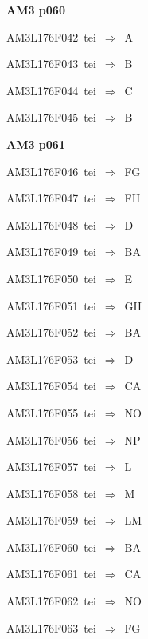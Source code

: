 \par\vfill\eject
{\bf\hfill AM3 p060\hfill\hbox{}}\par\bigskip
{\sixrm AM3L176F042\ {\sixit tei}\ }$\Rightarrow$\ A\par\smallskip
{\sixrm AM3L176F043\ {\sixit tei}\ }$\Rightarrow$\ B\par\smallskip
{\sixrm AM3L176F044\ {\sixit tei}\ }$\Rightarrow$\ C\par\smallskip
{\sixrm AM3L176F045\ {\sixit tei}\ }$\Rightarrow$\ B\par\smallskip

\par\vfill\eject
{\bf\hfill AM3 p061\hfill\hbox{}}\par\bigskip
{\sixrm AM3L176F046\ {\sixit tei}\ }$\Rightarrow$\ FG\par\smallskip
{\sixrm AM3L176F047\ {\sixit tei}\ }$\Rightarrow$\ FH\par\smallskip
{\sixrm AM3L176F048\ {\sixit tei}\ }$\Rightarrow$\ D\par\smallskip
{\sixrm AM3L176F049\ {\sixit tei}\ }$\Rightarrow$\ BA\par\smallskip
{\sixrm AM3L176F050\ {\sixit tei}\ }$\Rightarrow$\ E\par\smallskip
{\sixrm AM3L176F051\ {\sixit tei}\ }$\Rightarrow$\ GH\par\smallskip
{\sixrm AM3L176F052\ {\sixit tei}\ }$\Rightarrow$\ BA\par\smallskip
{\sixrm AM3L176F053\ {\sixit tei}\ }$\Rightarrow$\ D\par\smallskip
{\sixrm AM3L176F054\ {\sixit tei}\ }$\Rightarrow$\ CA\par\smallskip
{\sixrm AM3L176F055\ {\sixit tei}\ }$\Rightarrow$\ NO\par\smallskip
{\sixrm AM3L176F056\ {\sixit tei}\ }$\Rightarrow$\ NP\par\smallskip
{\sixrm AM3L176F057\ {\sixit tei}\ }$\Rightarrow$\ L\par\smallskip
{\sixrm AM3L176F058\ {\sixit tei}\ }$\Rightarrow$\ M\par\smallskip
{\sixrm AM3L176F059\ {\sixit tei}\ }$\Rightarrow$\ LM\par\smallskip
{\sixrm AM3L176F060\ {\sixit tei}\ }$\Rightarrow$\ BA\par\smallskip
{\sixrm AM3L176F061\ {\sixit tei}\ }$\Rightarrow$\ CA\par\smallskip
{\sixrm AM3L176F062\ {\sixit tei}\ }$\Rightarrow$\ NO\par\smallskip
{\sixrm AM3L176F063\ {\sixit tei}\ }$\Rightarrow$\ FG\par\smallskip
